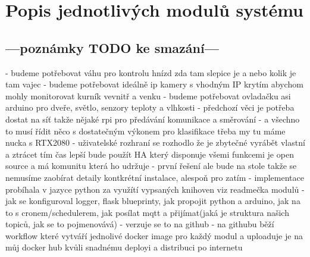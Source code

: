\newpage
\section{Popis jednotlivých modulů systému}\label{sec:popis-jednotlivych-modulu}



























\subsection{---poznámky TODO ke smazání---}\label{subsec:---poznamky-todo-ke-smazani---}
- budeme potřebovat váhu pro kontrolu hnízd zda tam slepice je a nebo kolik je tam vajec\newline
- budeme potřebovat ideálně ip kamery s vhodným IP krytím abychom mohly monitorovat kurník vevnitř a venku\newline
- budeme potřebovat ovladačku asi arduino pro dveře, světlo, senzory teploty a vlhkosti\newline
- předchozí věci je potřeba dostat na síť takže nějaké rpi pro předávání komunikace a směrování\newline
- a všechno to musí řídit něco s dostatečným výkonem pro klasifikace třeba my tu máme nucka s RTX2080\newline
- uživatelské rozhraní se rozhodlo že je zbytečné vyrábět vlastní a ztrácet tím čas lepší bude použít HA který disponuje všemi funkcemi je open source a má komunitu která ho udržuje
- první řešení ale bude na stole takže se nemusíme zaobírat detaily kontkrétní instalace, alespoň pro zatím
- implementace probíhala v jazyce python za využítí vypsaných knihoven viz readmečka modulů\newline
- jak se konfiguroval logger, flask blueprinty, jak propojit python a arduino, jak na to s cronem/schedulerem, jak posílat mqtt a přijímat(jaká je struktura našich topiců, jak se to pojmenovává)
- verzuje se to na github
- na githubu běží workflow které vytváří jednolivé docker image pro každý modul a uploaduje je na můj docker hub kvůli snadnému deployi a distribuci po internetu

